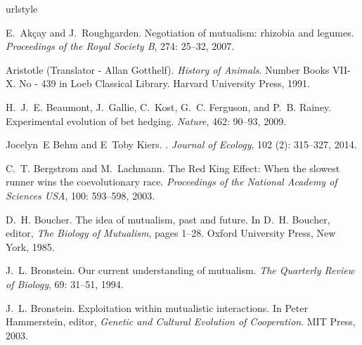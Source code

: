 \documentclass[12pt]{article}
\begin{document}
\begin{thebibliography}{61}
\providecommand{\natexlab}[1]{#1}
\providecommand{\url}[1]{\texttt{#1}}
\expandafter\ifx\csname urlstyle\endcsname\relax
  \providecommand{\doi}[1]{doi: #1}\else
  \providecommand{\doi}{doi: \begingroup \urlstyle{rm}\Url}\fi

E.~Ak{\c c}ay and J.~Roughgarden.
\newblock Negotiation of mutualism: rhizobia and legumes.
\newblock \emph{Proceedings of the Royal Society B}, 274: 25--32,
  2007.

{Aristotle (Translator - Allan Gotthelf)}.
\newblock \emph{History of Animals}.
\newblock Number {Books VII-X. No - 439} in Loeb Classical Library. Harvard
  University Press, 1991.

H.~J.~E. Beaumont, J.~Gallie, C.~Kost, G.~C. Ferguson, and P.~B. Rainey.
\newblock Experimental evolution of bet hedging.
\newblock \emph{Nature}, 462: 90--93, 2009.

Jocelyn~E Behm and E~Toby Kiers.
.
\newblock \emph{Journal of Ecology}, 102 (2): 315--327, 2014.

C.~T. Bergstrom and M.~Lachmann.
\newblock The {R}ed {K}ing {E}ffect: When the slowest runner wins the
  coevolutionary race.
\newblock \emph{Proceedings of the National Academy of Sciences USA},
  100: 593--598, 2003.

D.~H. Boucher.
\newblock The idea of mutualism, past and future.
\newblock In D.~H. Boucher, editor, \emph{The Biology of Mutualism}, pages
  1--28. Oxford University Press, New York, 1985.

J.~L. Bronstein.
\newblock Our current understanding of mutualism.
\newblock \emph{The Quarterly Review of Biology}, 69: 31--51, 1994.

J.~L. Bronstein.
\newblock Exploitation within mutualistic interactions.
\newblock In Peter Hammerstein, editor, \emph{Genetic and Cultural Evolution of
  Cooperation}. MIT Press, 2003.


\end{thebibliography}
\end{document}
